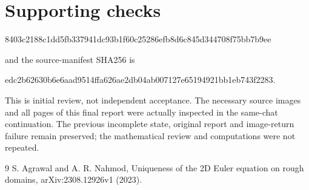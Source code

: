 \documentclass[10pt]{article}
\begin{document}
\section*{Supporting checks}
8403c2188c1dd5fb337941dc93b1f60c25286efb8d6c845d344708f75bb7b9ee\par
and the source-manifest SHA256 is\par
edc2b62630b6e6aad9514ffa626ae2db04ab007127e65194921bb1eb743f2283.\par
This is initial review, not independent acceptance. The necessary source images and all pages of this final report were actually inspected in the same-chat continuation. The previous incomplete state, original report and image-return failure remain preserved; the mathematical review and computations were not repeated.\par
9 S. Agrawal and A. R. Nahmod, Uniqueness of the 2D Euler equation on rough domains, arXiv:2308.12926v1 (2023).\par
\end{document}
